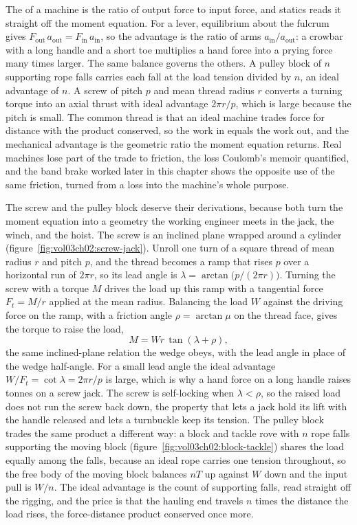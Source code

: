 The  of a machine is the ratio of output
force to input force, and statics reads it straight off the moment
equation. For a lever, equilibrium about the fulcrum gives $F_{\text{out}}
\, a_{\text{out}} = F_{\text{in}}\, a_{\text{in}}$, so the advantage is the
ratio of arms $a_{\text{in}}/a_{\text{out}}$: a crowbar with a long handle
and a short toe multiplies a hand force into a prying force many times
larger. The same balance governs the others. A pulley block of $n$
supporting rope falls carries each fall at the load tension divided by
$n$, an ideal advantage of $n$. A screw of pitch $p$ and mean thread
radius $r$ converts a turning torque into an axial thrust with ideal
advantage $2\pi r/p$, which is large because the pitch is small. The
common thread is that an ideal machine trades force for distance with the
product conserved, so the work in equals the work out, and the mechanical
advantage is the geometric ratio the moment equation returns. Real
machines lose part of the trade to friction, the loss Coulomb's memoir
quantified, and the band brake worked later in this chapter shows the
opposite use of the same friction, turned from a loss into the machine's
whole purpose.

The screw and the pulley block deserve their derivations, because both
turn the moment equation into a geometry the working engineer meets in the
jack, the winch, and the hoist. The screw is an inclined plane wrapped
around a cylinder (figure~\ref{fig:vol03ch02:screw-jack}). Unroll one turn
of a square thread of mean radius $r$ and pitch $p$, and the thread becomes
a ramp that rises $p$ over a horizontal run of $2\pi r$, so its lead angle
is $\lambda = \arctan\!\big(p/(2\pi r)\big)$. Turning the screw with a
torque $M$ drives the load up this ramp with a tangential force
$F_t = M/r$ applied at the mean radius. Balancing the load $W$ against the
driving force on the ramp, with a friction angle $\rho = \arctan\mu$ on the
thread face, gives the torque to raise the load,
\[
M = W r\,\tan(\lambda + \rho),
\]
the same inclined-plane relation the wedge obeys, with the lead angle in
place of the wedge half-angle. For a small lead angle the ideal advantage
$W/F_t = \cot\lambda = 2\pi r/p$ is large, which is why a hand force on a
long handle raises tonnes on a screw jack. The screw is self-locking when
$\lambda < \rho$, so the raised load does not run the screw back down, the
property that lets a jack hold its lift with the handle released and lets a
turnbuckle keep its tension. The pulley block trades the same product a
different way: a block and tackle rove with $n$ rope falls supporting the
moving block (figure~\ref{fig:vol03ch02:block-tackle}) shares the load
equally among the falls, because an ideal rope carries one tension
throughout, so the free body of the moving block balances $nT$ up against
$W$ down and the input pull is $W/n$. The ideal advantage is the count of
supporting falls, read straight off the rigging, and the price is that the
hauling end travels $n$ times the distance the load rises, the
force-distance product conserved once more.

